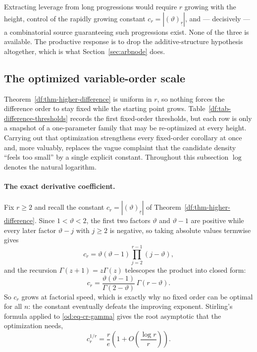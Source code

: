 \documentclass[11pt,oneside]{article}
\theoremstyle{definition}
\theoremstyle{remark}
\newcommand{\thetaq}{\vartheta}
\newcommand{\fall}[2]{\left(#1\right)_{\!\underline{#2}}}
\begin{document}
Extracting leverage from long progressions would require $r$ growing with the height, control
of the rapidly growing constant $c_r=|\fall{\thetaq}{r}|$, and --- decisively --- a
combinatorial source guaranteeing such progressions exist.  None of the three is available.
The productive response is to drop the additive-structure hypothesis altogether, which is
what Section~\ref{sec:arbnode} does.

\subsection{The optimized variable-order scale}\label{od:optimized}

Theorem~\ref{df:thm-higher-difference} is uniform in $r$, so nothing forces the difference
order to stay fixed while the starting point grows.
Table~\ref{df:tab-difference-thresholds} records the first fixed-order thresholds, but each
row is only a snapshot of a one-parameter family that may be re-optimized at every height.
Carrying out that optimization strengthens every fixed-order corollary at once and, more
valuably, replaces the vague complaint that the candidate density ``feels too small'' by a
single explicit constant.  Throughout this subsection $\log$ denotes the natural logarithm.

\paragraph{The exact derivative coefficient.}
Fix $r\ge2$ and recall the constant $c_r=|\fall{\thetaq}{r}|$ of
Theorem~\ref{df:thm-higher-difference}.  Since $1<\thetaq<2$, the first two factors
$\thetaq$ and $\thetaq-1$ are positive while every later factor $\thetaq-j$ with $j\ge2$ is
negative, so taking absolute values termwise gives
\[
 c_r=\thetaq(\thetaq-1)\prod_{j=2}^{r-1}(j-\thetaq),
\]
and the recursion $\Gamma(z+1)=z\Gamma(z)$ telescopes the product into closed form:
\begin{equation}
 c_r=\frac{\thetaq(\thetaq-1)}{\Gamma(2-\thetaq)}\,\Gamma(r-\thetaq).
 \label{od:eq-cr-gamma}
\end{equation}
So $c_r$ grows at factorial speed, which is exactly why no fixed order can be optimal for all
$n$: the constant eventually defeats the improving exponent.  Stirling's formula applied to
\eqref{od:eq-cr-gamma} gives the root asymptotic that the optimization needs,
\begin{equation}
 c_r^{1/r}=\frac re\left(1+O\!\left(\frac{\log r}{r}\right)\right).
 \label{od:eq-cr-root}
\end{equation}
\end{document}
